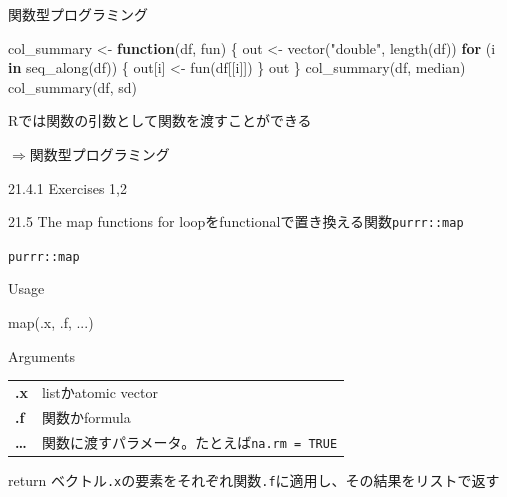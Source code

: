 \documentclass[
  ignorenonframetext,
  aspectratio=169]{beamer}
\newenvironment{Shaded}{\begin{snugshade}}{\end{snugshade}}
\newcommand{\ControlFlowTok}[1]{\textcolor[rgb]{0.13,0.29,0.53}{\textbf{#1}}}
\newcommand{\FunctionTok}[1]{\textcolor[rgb]{0.00,0.00,0.00}{#1}}
\newcommand{\NormalTok}[1]{#1}
\newcommand{\OtherTok}[1]{\textcolor[rgb]{0.56,0.35,0.01}{#1}}
\newcommand{\StringTok}[1]{\textcolor[rgb]{0.31,0.60,0.02}{#1}}
\begin{document}
\begin{frame}[fragile]{関数型プログラミング}
\protect\hypertarget{ux95a2ux6570ux578bux30d7ux30edux30b0ux30e9ux30dfux30f3ux30b0}{}
\begin{Shaded}
\begin{Highlighting}[]
\NormalTok{col\_summary }\OtherTok{\textless{}{-}} \ControlFlowTok{function}\NormalTok{(df, fun) \{}
\NormalTok{    out }\OtherTok{\textless{}{-}} \FunctionTok{vector}\NormalTok{(}\StringTok{"double"}\NormalTok{, }\FunctionTok{length}\NormalTok{(df))}
  \ControlFlowTok{for}\NormalTok{ (i }\ControlFlowTok{in} \FunctionTok{seq\_along}\NormalTok{(df)) \{}
\NormalTok{        out[i] }\OtherTok{\textless{}{-}} \FunctionTok{fun}\NormalTok{(df[[i]])}
\NormalTok{    \}}
\NormalTok{    out}
\NormalTok{\}}
\FunctionTok{col\_summary}\NormalTok{(df, median)}
\FunctionTok{col\_summary}\NormalTok{(df, sd)}
\end{Highlighting}
\end{Shaded}

Rでは関数の引数として関数を渡すことができる

\(\Rightarrow\)関数型プログラミング
\end{frame}

\begin{frame}{21.4.1 Exercises}
\protect\hypertarget{exercises-2}{}
1,2
\end{frame}

\begin{frame}[fragile]{21.5 The map functions}
\protect\hypertarget{the-map-functions}{}
for loopをfunctionalで置き換える関数\texttt{purrr::map}
\end{frame}

\begin{frame}[fragile]{\texttt{purrr::map}}
\protect\hypertarget{purrrmap}{}
\begin{block}{Usage}
\protect\hypertarget{usage}{}
\begin{Shaded}
\begin{Highlighting}[]
\FunctionTok{map}\NormalTok{(.x, .f, ...)}
\end{Highlighting}
\end{Shaded}
\end{block}

\begin{block}{Arguments}
\protect\hypertarget{arguments}{}
\begin{longtable}[]{@{}ll@{}}
\toprule()
\endhead
\textbf{.x} & listかatomic vector \\
\textbf{.f} & 関数かformula \\
\textbf{\ldots{}} &
関数に渡すパラメータ。たとえば\texttt{na.rm\ =\ TRUE} \\
\bottomrule()
\end{longtable}
\end{block}

\begin{block}{return}
\protect\hypertarget{return}{}
ベクトル\texttt{.x}の要素をそれぞれ関数\texttt{.f}に適用し、その結果をリストで返す
\end{block}
\end{frame}
\end{document}
